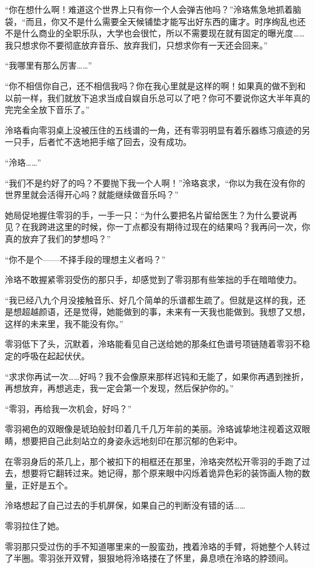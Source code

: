 \documentclass[UTF8, scheme = chinese, openany]{ctexbook}
\begin{document}
“你在想什么啊！难道这个世界上只有你一个人会弹吉他吗？”泠珞焦急地抓着脑袋，“而且，你又不是什么需要全天候铺垫才能写出好东西的庸才。时序绚乱也还不是什么商业的全职乐队，大学也会很忙，所以不需要现在就有固定的曝光度……我只想求你不要彻底放弃音乐、放弃我们，只想求你有一天还会回来。”

“我哪里有那么厉害……”

“你不相信你自己，还不相信我吗？你在我心里就是这样的啊！如果真的做不到和以前一样，我们就放下追求当成自娱自乐总可以了吧？你可不要说你这大半年真的完完全全放下音乐了。”

泠珞看向零羽桌上没被压住的五线谱的一角，还有零羽明显有着乐器练习痕迹的另一只手，后者忙不迭地把手缩了回去，没有成功。

“泠珞……”

“我们不是约好了的吗？不要抛下我一个人啊！”泠珞哀求，“你以为我在没有你的世界里就会活得开心吗？就能继续做音乐吗？”

她局促地握住零羽的手，一手一只：“为什么要把名片留给医生？为什么要说再见？在我跨进这里的时候，你一丁点都没有期待过现在的结果吗？我再问一次，你真的放弃了我们的梦想吗？”

“你不是个——不择手段的理想主义者吗？”

泠珞不敢握紧零羽受伤的那只手，却感觉到了零羽那有些笨拙的手在暗暗使力。

“我已经八九个月没接触音乐、好几个简单的乐谱都生疏了。但就是这样的我，还是想超越颜语，还是觉得，她能做到的事，未来有一天我也能做到。我想了又想，这样的未来里，我不能没有你。”

零羽低下了头，沉默着，泠珞能看见自己送给她的那条红色谱号项链随着零羽不稳定的呼吸在起起伏伏。

“求求你再试一次……好吗？我不会像原来那样迟钝和无能了，如果你再遇到挫折，再想放弃，再想逃走，我一定会第一个发现，然后保护你的。”

“零羽，再给我一次机会，好吗？”

零羽褐色的双眼像是琥珀般封印着几千几万年前的美丽。泠珞诚挚地注视着这双眼睛，想要把自己此刻站立的身姿永远地刻印在那沉郁的色彩中。

在零羽身后的茶几上，那个被扣下的相框还在那里，泠珞突然松开零羽的手跑了过去，想要将它翻转过来。她记得，那个原来眼中闪烁着诡异色彩的装饰画人物的数量，正好是五个。

泠珞想起了自己过去的手机屏保，如果自己的判断没有错的话……

零羽拉住了她。

零羽那只受过伤的手不知道哪里来的一股蛮劲，拽着泠珞的手臂，将她整个人转过了半圈。零羽张开双臂，狠狠地将泠珞搂在了怀里，鼻息喷在泠珞的脖颈间。
\end{document}
